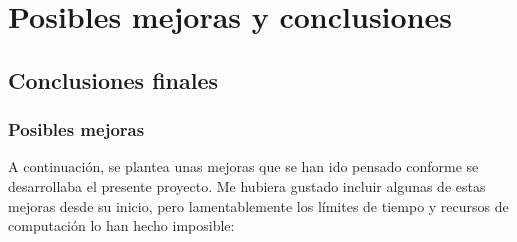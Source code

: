 \documentclass[11pt,fleqn]{book} %
\begin{document}
%
%
%


\part{Posibles mejoras y conclusiones}

\chapter{Conclusiones finales}

\section{Posibles mejoras}

A continuación, se plantea unas mejoras que se han ido pensado conforme se desarrollaba el presente proyecto. Me hubiera gustado incluir algunas de estas mejoras desde su inicio, pero lamentablemente los límites de tiempo y recursos de computación lo han hecho imposible:
\end{document}
